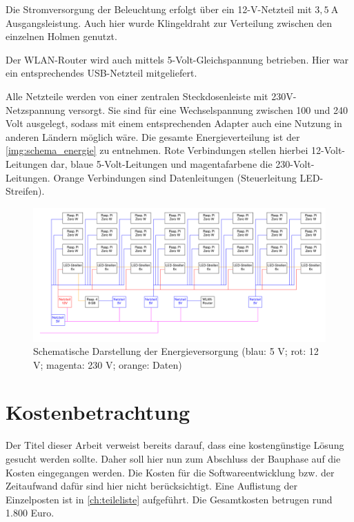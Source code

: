 \documentclass[./00PhotoBox.tex]{subfiles}
\begin{document}
Die Stromversorgung der Beleuchtung erfolgt über ein 12-V-Netzteil mit $3,5~\text{A}$ Ausgangsleistung. Auch hier wurde Klingeldraht zur Verteilung zwischen den einzelnen Holmen genutzt.

Der WLAN-Router wird auch mittels 5-Volt-Gleichspannung betrieben. Hier war ein entsprechendes USB-Netzteil mitgeliefert.

Alle Netzteile werden von einer zentralen Steckdosenleiste mit 230V-Netzspannung versorgt. Sie sind für eine Wechselspannung zwischen 100 und 240 Volt ausgelegt, sodass mit einem entsprechenden Adapter auch eine Nutzung in anderen Ländern möglich wäre. Die gesamte Energieverteilung ist der \autoref{img:schema_energie} zu entnehmen. Rote Verbindungen stellen hierbei 12-Volt-Leitungen dar, blaue 5-Volt-Leitungen und magentafarbene die 230-Volt-Leitungen. Orange Verbindungen sind Datenleitungen (Steuerleitung LED-Streifen).

\begin{figure}
    \centering
    \includegraphics[width=1.\textwidth]{./img/uml/uml_energie.pdf}
    \caption{Schematische Darstellung der Energieversorgung (blau: 5 V; rot: 12 V; magenta: 230 V; orange: Daten)} %
    \label{img:schema_energie} %
\end{figure}


\section{Kostenbetrachtung}
Der Titel dieser Arbeit verweist bereits darauf, dass eine kostengünstige Lösung gesucht werden sollte. Daher soll hier nun zum Abschluss der Bauphase auf die Kosten eingegangen werden. Die Kosten für die Softwareentwicklung bzw. der Zeitaufwand dafür sind hier nicht berücksichtigt. Eine Auflistung der Einzelposten ist in \autoref{ch:teileliste} aufgeführt. Die Gesamtkosten betrugen rund 1.800 Euro.
\end{document}
